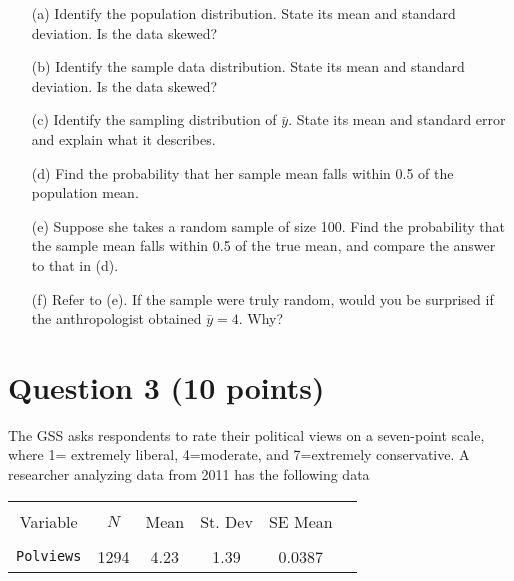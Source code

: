 \documentclass[12pt,letterpaper]{article}
\begin{document}
\begin{itemize}

\item[(a)] Identify the population distribution. State its mean and standard deviation. Is the data skewed?\\

\item[(b)] Identify the sample data distribution. State its mean and standard deviation. Is the data skewed?\\

\item[(c)] Identify the sampling distribution of $\bar{y}$. State its mean and standard error and explain what it describes.\\

\item[(d)] Find the probability that her sample mean falls within 0.5 of the population mean.\\

\item[(e)] Suppose she takes a random sample of size 100. Find the probability that the sample mean falls within 0.5 of the true mean, and compare the answer to that in (d).\\

\item[(f)] Refer to (e). If the sample were truly random, would you be surprised if the anthropologist obtained $\bar{y}=4$. Why?\\

\end{itemize}

\section*{Question 3 (10 points)}
The GSS asks respondents to rate their political views on a seven-point scale, where 1= extremely liberal, 4=moderate, and 7=extremely conservative. A researcher analyzing data from 2011 has the following data

\begin{table}[H]
\centering
\begin{tabular}{cccccc}
\hline \\[-1.8ex]
Variable & $N$ & Mean  & St. Dev & SE Mean \\ 
\hline \\[-1.8ex]
\texttt{Polviews} & 1294 & 4.23  & 1.39 & 0.0387 \\ 
\hline
\end{tabular} 
\end{table}
\end{document}

